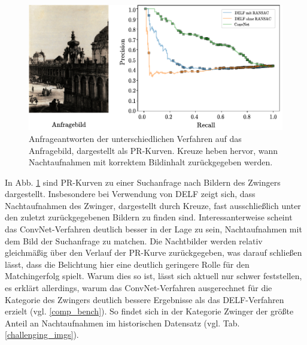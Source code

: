 \begin{figure}[h]
\centering
\includegraphics[scale=1.0]{night_pr}
\caption{Anfrageantworten der unterschiedlichen Verfahren auf das Anfragebild, dargestellt als PR-Kurven. Kreuze heben hervor, wann Nachtaufnahmen mit korrektem Bildinhalt zurückgegeben werden.}
\label{night_pr}
\end{figure}
In Abb. \ref{night_pr} sind PR-Kurven zu einer Suchanfrage nach Bildern des Zwingers dargestellt. Insbesondere bei Verwendung von DELF zeigt sich, dass Nachtaufnahmen des Zwinger, dargestellt durch Kreuze, fast ausschließlich unter den zuletzt zurückgegebenen Bildern zu finden sind. Interessanterweise scheint das ConvNet-Verfahren deutlich besser in der Lage zu sein, Nachtaufnahmen mit dem Bild der Suchanfrage zu matchen. Die Nachtbilder werden relativ gleichmäßig über den Verlauf der PR-Kurve zurückgegeben, was darauf schließen lässt, dass die Belichtung hier eine deutlich geringere Rolle für den Matchingerfolg spielt. Warum dies so ist, lässt sich aktuell nur schwer feststellen, es erklärt allerdings, warum das ConvNet-Verfahren ausgerechnet für die Kategorie des Zwingers deutlich bessere Ergebnisse als das DELF-Verfahren erzielt (vgl. \ref{comp_bench}). So findet sich in der Kategorie Zwinger der größte Anteil an Nachtaufnahmen im historischen Datensatz (vgl. Tab. \ref{challenging_imgs}).
\begin{table}[h]
\caption{Anteil an Objektdarstellungen im historischen Datensatz, die unterschiedliche erschwerende Besonderheiten vorweisen.}
\label{challenging_imgs}
\end{table}
